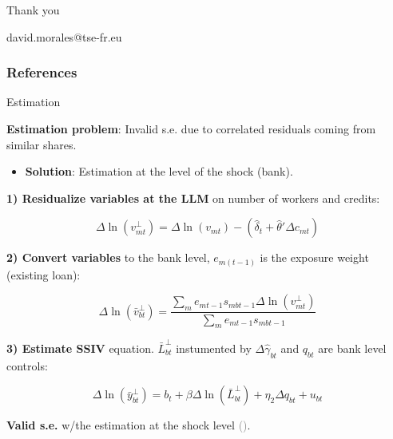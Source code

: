 \documentclass[aspectratio=169]{beamer}
\begin{document}
\begin{frame}[noframenumbering]
\centering
\Huge Thank you

\vspace{10mm}

\Large david.morales@tse-fr.eu

\end{frame}


\begin{frame}[noframenumbering]
\frametitle{\textbf{References}} 

\tiny



\end{frame}


\appendix

\begin{frame}[noframenumbering]{Estimation} \label{iv_bank_level}

\textbf{Estimation problem}: Invalid s.e. due to correlated residuals coming from similar shares.
\begin{itemize}
    \item[$\Rightarrow$] \textbf{Solution}: Estimation at the level of the shock (bank).
\end{itemize}

\textbf{1) Residualize variables at the LLM} on number of workers and credits:

\begin{equation*}
    \Delta \ln(v_{mt}^{\perp}) = \Delta \ln(v_{mt}) - (\hat{\delta}_t + \hat{\theta}' \Delta c_{mt} ) 
\end{equation*}

\textbf{2) Convert variables} to the bank level, $e_{m(t-1)}$ is the exposure weight (existing loan):

\begin{equation*}
    \Delta \ln(\bar{v}_{bt}^{\perp}) = \frac{\sum_m e_{mt-1} s_{mbt-1} \Delta \ln(v_{mt}^{\perp})}{\sum_m e_{mt-1} s_{mbt-1}}
\end{equation*}

\textbf{3) Estimate SSIV} equation. $\bar{L}_{bt}^{\perp}$ instumented by $\Delta \hat{\gamma}_{bt}$ and $q_{bt}$ are bank level controls:

\begin{equation*}
    \Delta \ln(\bar{y}_{bt}^{\perp}) = b_t +\beta \Delta \ln(\bar{L}_{bt}^{\perp}) + \eta_2 \Delta q_{bt} + u_{bt} 
\end{equation*}

\vspace{3mm}

\textbf{Valid s.e.} w/the estimation at the shock level \textcolor{gray}{(\cite{borusyak2022quasi})}. \hyperlink{iv_market_level}{}

\end{frame}
\end{document}
